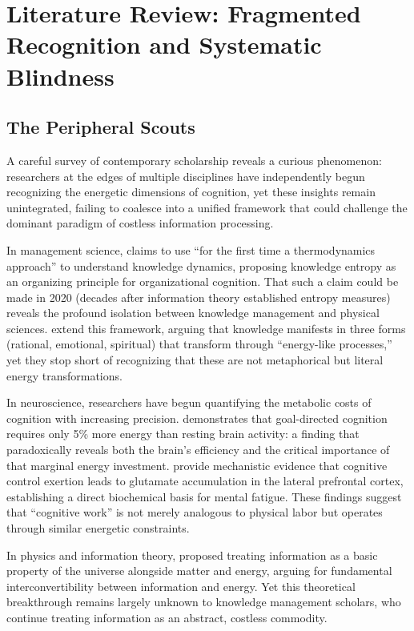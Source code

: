 \section{Literature Review: Fragmented Recognition and Systematic Blindness}

\subsection{The Peripheral Scouts}

A careful survey of contemporary scholarship reveals a curious phenomenon: researchers at the edges of multiple disciplines have independently begun recognizing the energetic dimensions of cognition, yet these insights remain unintegrated, failing to coalesce into a unified framework that could challenge the dominant paradigm of costless information processing.

In management science, \citet{bratianu2020} claims to use ``for the first time a thermodynamics approach'' to understand knowledge dynamics, proposing knowledge entropy as an organizing principle for organizational cognition. That such a claim could be made in 2020 (decades after information theory established entropy measures) reveals the profound isolation between knowledge management and physical sciences. \citet{bratianu2020b} extend this framework, arguing that knowledge manifests in three forms (rational, emotional, spiritual) that transform through ``energy-like processes,'' yet they stop short of recognizing that these are not metaphorical but literal energy transformations.

In neuroscience, researchers have begun quantifying the metabolic costs of cognition with increasing precision. \citet{jamadar2025} demonstrates that goal-directed cognition requires only 5\% more energy than resting brain activity: a finding that paradoxically reveals both the brain's efficiency and the critical importance of that marginal energy investment. \citet{wiehler2022} provide mechanistic evidence that cognitive control exertion leads to glutamate accumulation in the lateral prefrontal cortex, establishing a direct biochemical basis for mental fatigue. These findings suggest that ``cognitive work'' is not merely analogous to physical labor but operates through similar energetic constraints.

In physics and information theory, \citet{stonier1996} proposed treating information as a basic property of the universe alongside matter and energy, arguing for fundamental interconvertibility between information and energy. Yet this theoretical breakthrough remains largely unknown to knowledge management scholars, who continue treating information as an abstract, costless commodity.

